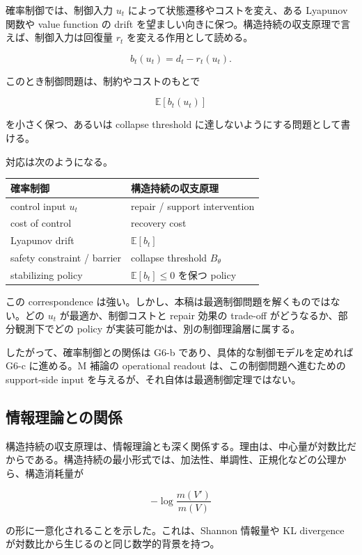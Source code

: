 \documentclass[12pt,a4paper]{article}
\begin{document}
確率制御では、制御入力 \(u_{t}\) によって状態遷移やコストを変え、ある Lyapunov 関数や value function の drift を望ましい向きに保つ。構造持続の収支原理で言えば、制御入力は回復量 \(r_{t}\) を変える作用として読める。

\[
b_{t}(u_{t})=d_{t}-r_{t}(u_{t}).
\]

このとき制御問題は、制約やコストのもとで

\[
\mathbb E[b_{t}(u_{t})]
\]

を小さく保つ、あるいは collapse threshold に達しないようにする問題として書ける。

対応は次のようになる。

{\def\LTcaptype{table} %
\begin{longtable}[]{@{}ll@{}}
\toprule\noalign{}
確率制御 & 構造持続の収支原理 \\
\midrule\noalign{}
\endhead
\bottomrule\noalign{}
\endlastfoot
control input \(u_t\) & repair / support intervention \\
cost of control & recovery cost \\
Lyapunov drift & \(\mathbb E[b_t]\) \\
safety constraint / barrier & collapse threshold \(B_\theta\) \\
stabilizing policy & \(\mathbb E[b_t]\le 0\) を保つ policy \\
\end{longtable}
}

この correspondence は強い。しかし、本稿は最適制御問題を解くものではない。どの \(u_{t}\) が最適か、制御コストと repair 効果の trade-off がどうなるか、部分観測下でどの policy が実装可能かは、別の制御理論層に属する。

したがって、確率制御との関係は G6-b であり、具体的な制御モデルを定めれば G6-c に進める。M 補論の operational readout は、この制御問題へ進むための support-side input を与えるが、それ自体は最適制御定理ではない。

\subsection{情報理論との関係}\label{ux60c5ux5831ux7406ux8ad6ux3068ux306eux95a2ux4fc2}

構造持続の収支原理は、情報理論とも深く関係する。理由は、中心量が対数比だからである。構造持続の最小形式では、加法性、単調性、正規化などの公理から、構造消耗量が

\[
-\log \frac{m(V')}{m(V)}
\]

の形に一意化されることを示した。これは、Shannon 情報量や KL divergence が対数比から生じるのと同じ数学的背景を持つ。
\end{document}
